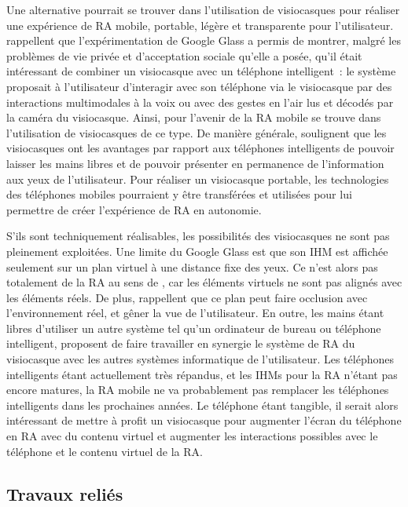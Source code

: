 Une alternative pourrait se trouver dans l'utilisation de visiocasques pour réaliser une expérience de RA mobile, portable, légère et transparente pour l'utilisateur. \citet{KoelleKranzMoeller2015} rappellent que l'expérimentation de Google Glass a permis de montrer, malgré les problèmes de vie privée et d'acceptation sociale qu'elle a posée, qu'il était intéressant de combiner un visiocasque avec un téléphone intelligent~: le système proposait à l'utilisateur d'interagir avec son téléphone via le visiocasque par des interactions multimodales à la voix ou avec des gestes en l'air lus et décodés par la caméra du visiocasque. Ainsi, pour \citet{HuangHuiPeyloEtAl2013} l'avenir de la RA mobile se trouve dans l'utilisation de visiocasques de ce type. De manière générale, \citet{SerranoEnsYangEtAl2015a} soulignent que les visiocasques ont les avantages par rapport aux téléphones intelligents de pouvoir laisser les mains libres et de pouvoir présenter en permanence de l'information aux yeux de l'utilisateur. Pour réaliser un visiocasque portable, les technologies des téléphones mobiles pourraient y être transférées et utilisées pour lui permettre de créer l'expérience de RA en autonomie.

S'ils sont techniquement réalisables, les possibilités des visiocasques ne sont pas pleinement exploitées. Une limite du Google Glass est que son IHM est affichée seulement sur un plan virtuel à une distance fixe des yeux. Ce n'est alors pas totalement de la RA au sens de \citet{AzumaBaillotBehringerEtAl2001}, car les éléments virtuels ne sont pas alignés avec les éléments réels. De plus, \citet{SerranoEnsYangEtAl2015a} rappellent que ce plan peut faire occlusion avec l'environnement réel, et gêner la vue de l'utilisateur. En outre, les mains étant libres d'utiliser un autre système tel qu'un ordinateur de bureau ou téléphone intelligent, \citet{SerranoEnsYangEtAl2015} proposent de faire travailler en synergie le système de RA du visiocasque avec les autres systèmes informatique de l'utilisateur. Les téléphones intelligents étant actuellement très répandus, et les IHMs pour la RA n'étant pas encore matures, la RA mobile ne va probablement pas remplacer les téléphones intelligents dans les prochaines années. Le téléphone étant tangible, il serait alors intéressant de mettre à profit un visiocasque pour augmenter l'écran du téléphone en RA avec du contenu virtuel et augmenter les interactions possibles avec le téléphone et le contenu virtuel de la RA.


\subsection*{Travaux reliés}
